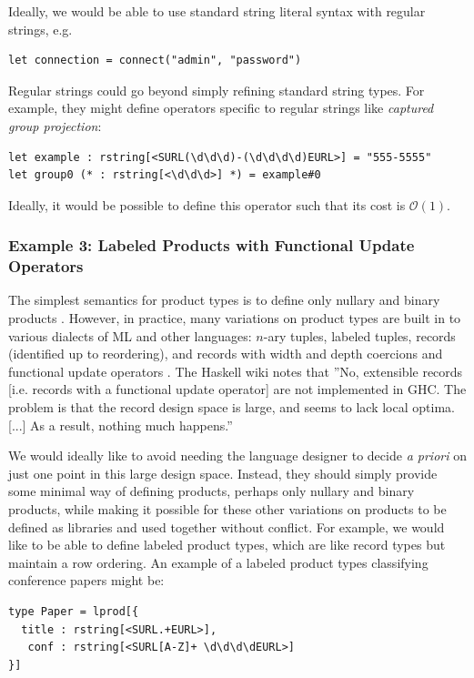 Ideally, we would be able to use standard string literal syntax with regular strings, e.g. 
\begin{lstlisting}[numbers=none]
let connection = connect("admin", "password")
\end{lstlisting}

Regular strings could go beyond simply refining standard string types. For example, they might define operators specific to regular strings like \emph{captured group projection}:
\begin{lstlisting}[numbers=none]
let example : rstring[<SURL(\d\d\d)-(\d\d\d\d)EURL>] = "555-5555"
let group0 (* : rstring[<\d\d\d>] *) = example#0
\end{lstlisting}
Ideally, it would be possible to define this operator such that its cost is $\mathcal{O}(1)$. %

\subsubsection{Example 3: Labeled Products with Functional Update Operators}\label{sec:lprod}
The simplest semantics for product types is to define only nullary and binary products \cite{pfpl}. However, in practice, many variations on product types are built in to various dialects of ML and other languages: $n$-ary tuples, labeled tuples, 
records (identified up to reordering), and 
records with width and depth coercions \cite{Cardelli:1984:SMI:1096.1098} and functional update operators \cite{ocaml-manual}. {The Haskell wiki notes that ''No, extensible records [i.e. records with a functional update operator] are not implemented in GHC. The problem is that the record design space is large, and seems to lack local optima. [...] As a result, nothing much happens.'' \cite{GHCFAQ}}%


We would ideally like to avoid needing the language designer to decide \emph{a priori} on just one point in this large design space. Instead, they should simply provide some minimal way of defining products, perhaps only nullary and binary products, while making it possible for these other variations on products to be defined as libraries and used together without conflict. For example, we would like to be able to define labeled product types, which are like record types but maintain a row ordering. An example of a labeled product types classifying conference papers might be:
\begin{lstlisting}[numbers=none]
type Paper = lprod[{
  title : rstring[<SURL.+EURL>], 
   conf : rstring[<SURL[A-Z]+ \d\d\d\dEURL>]
}]
\end{lstlisting}

